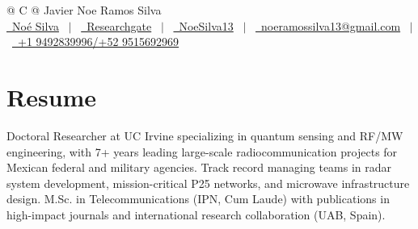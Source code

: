 \documentclass[letterpaper,10pt]{article}
\begin{document}
\pagestyle{empty} 



\begin{tabularx}{\linewidth}{@{} C @{}}
\Huge{Javier Noe Ramos Silva} \\[7.5pt]
\href{https://www.linkedin.com/in/noe-silva-4b9469a4/}{\raisebox{-0.05\height}\faLinkedin\ Noé Silva} \ $|$ \ 
\href{https://www.researchgate.net/profile/Javier-Ramos-Silva}{\raisebox{-0.05\height}\faGlobe \ Researchgate} \ $|$ \ 
\href{https://github.com/NoeSilva13}{\raisebox{-0.05\height}\faGithub\ NoeSilva13} \ $|$ \ 
\href{mailto:noeramossilva13@gmail.com}{\raisebox{-0.05\height}\faEnvelope \ noeramossilva13@gmail.com} \ $|$ \ 
\href{tel:+529515692969}{\raisebox{-0.05\height}\faMobile \ +1 9492839996/+52 9515692969} \\
\end{tabularx}


\section{Resume}
Doctoral Researcher at UC Irvine specializing in quantum sensing and RF/MW engineering, with 7+ years leading large-scale radiocommunication projects for Mexican federal and military agencies. Track record managing teams in radar system development, mission-critical P25 networks, and microwave infrastructure design. M.Sc. in Telecommunications (IPN, Cum Laude) with publications in high-impact journals and international research collaboration (UAB, Spain).
\end{document}
